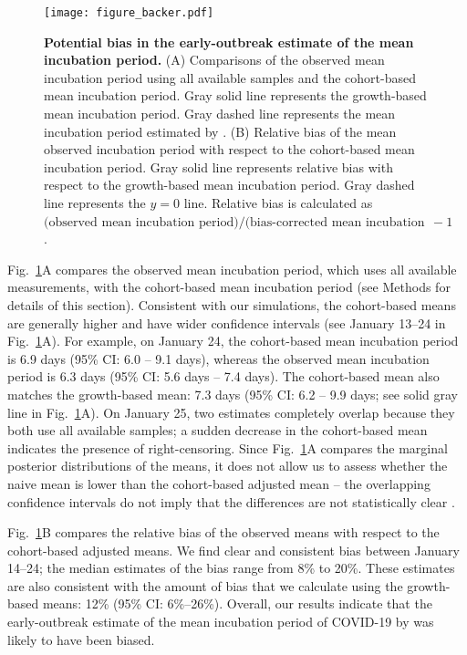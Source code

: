 \documentclass[12pt]{article}
\newcommand{\fref}[1]{Fig.~\ref{fig:#1}}
\begin{document}
\begin{figure}[!th]
\texttt{[image: figure\_backer.pdf]}
\caption{
\textbf{Potential bias in the early-outbreak estimate of the mean incubation period.}
(A) Comparisons of the observed mean incubation period using all available samples and the cohort-based mean incubation period.
Gray solid line represents the growth-based mean incubation period.
Gray dashed line represents the mean incubation period estimated by \cite{backer2020incubation}.
(B) Relative bias of the mean observed incubation period with respect to the cohort-based mean incubation period.
Gray solid line represents relative bias with respect to the growth-based mean incubation period.
Gray dashed line represents the $y=0$ line.
Relative bias is calculated as $\textrm{(observed mean incubation period)/(bias-corrected mean incubation period)} - 1$.
}
\label{fig:backer}
\end{figure}

\fref{backer}A compares the observed mean incubation period, which uses all available measurements, with the cohort-based mean incubation period (see Methods for details of this section).
Consistent with our simulations, the cohort-based means are generally higher and have wider confidence intervals (see January 13--24 in \fref{backer}A).
For example, on January 24, the cohort-based mean incubation period is 6.9 days (95\% CI: 6.0 -- 9.1 days), whereas the observed mean incubation period is 6.3 days (95\% CI: 5.6 days -- 7.4 days).
The cohort-based mean also matches the growth-based mean: 7.3 days (95\% CI: 6.2 -- 9.9 days; see solid gray line in \fref{backer}A).
On January 25, two estimates completely overlap because they both use all available samples; a sudden decrease in the cohort-based mean indicates the presence of right-censoring.
Since \fref{backer}A compares the marginal posterior distributions of the means, it does not allow us to assess whether the naive mean is lower than the cohort-based adjusted mean -- the overlapping confidence intervals do not imply that the differences are not statistically clear \citep{dushoff2019can}.

\fref{backer}B compares the relative bias of the observed means with respect to the cohort-based adjusted means.
We find clear and consistent bias between January 14--24;
the median estimates of the bias range from 8\% to 20\%.
These estimates are also consistent with the amount of bias that we calculate using the growth-based means: 12\% (95\% CI: 6\%--26\%).
Overall, our results indicate that the early-outbreak estimate of the mean incubation period of COVID-19 by \cite{backer2020incubation} was likely to have been biased.
\end{document}
